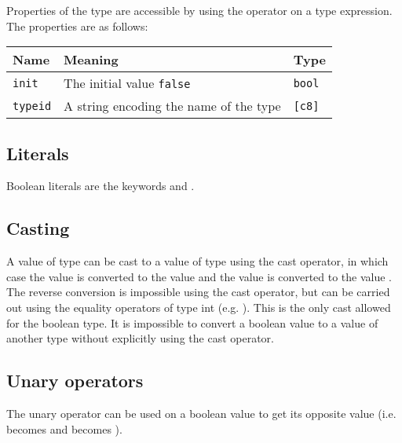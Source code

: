 Properties of the type  are accessible by using the operator
\token{::} on a type expression. The properties are as follows:

\begin{center}
  \begin{adjustbox}{max width=\linewidth}
    \begin{tabular}{|l|ll|}
      \hline
      Name & Meaning & Type\\[0pt]
      \hline
      \hline
      \texttt{init} & The initial value \texttt{false} & \texttt{bool}\\[0pt]
      \hline
      \texttt{typeid} & A string encoding the name of the type & \texttt{[c8]}\\[0pt]
      \hline
    \end{tabular}
  \end{adjustbox}
\end{center}

\subsection{Literals}
\label{sec:org7620b9c}

Boolean literals are the keywords  and .

\subsection{Casting}
\label{sec:org7cd1f94}

A value of type  can be cast to a value of type  using
the cast operator, in which case the value  is converted to the
value  and the value  is converted to the value
. The reverse conversion is impossible using the cast operator, but
can be carried out using the equality operators of type int (e.g. ). This is the only cast allowed for the boolean type. It is impossible to
convert a boolean value to a value of another type without explicitly using the
cast operator.

\subsection{Unary operators}
\label{sec:orgb412ce4}

The unary operator \token{!} can be used on a boolean value to get its opposite
value (i.e.  becomes  and  becomes
).

